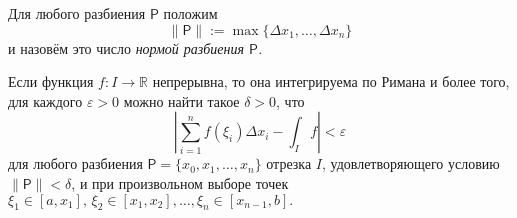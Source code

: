 \begin{definition}
    Для любого разбиения $\mathsf{P}$ положим
    \[
     \|\mathsf{P}\|:=\max \{ \Delta x_1,\ldots, \Delta x_n \}
    \]
    и назовём это число \textit{нормой разбиения $\mathsf{P}$.}
\end{definition}


\begin{theorem}\label{continous=integrable}
    Если функция $f:I \to \mathbb{R}$ непрерывна, то она интегрируема по Римана и более того, для каждого $\varepsilon>0$ можно найти такое $\delta>0$, что
    \[
     \left| \sum_{i=1}^n f(\xi_i) \Delta x_i - \int_I f \right| < \varepsilon
    \]
    для любого разбиения $\mathsf{P} = \{x_0,x_1,\ldots, x_n\}$ отрезка $I$, удовлетворяющего условию $\| \mathsf{P} \| < \delta$, и при произвольном выборе точек $\xi_1 \in [a,x_1],\, \xi_2 \in [x_1,x_2], \ldots, \xi_n \in [x_{n-1},b].$
\end{theorem}
